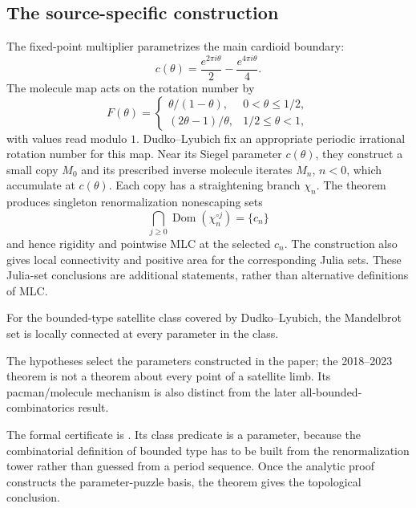\subsection{The source-specific construction}

The fixed-point multiplier parametrizes the main cardioid boundary:
\[
 c(\theta)=\frac{e^{2\pi i\theta}}2
              -\frac{e^{4\pi i\theta}}4.
\]
The molecule map acts on the rotation number by
\[
 F(\theta)=
 \begin{cases}
 \theta/(1-\theta),&0<\theta\le1/2,\\
 (2\theta-1)/\theta,&1/2\le\theta<1,
 \end{cases}
\]
with values read modulo $1$.  Dudko--Lyubich fix an appropriate
periodic irrational rotation number for this map.  Near its Siegel
parameter $c(\theta)$, they construct a small copy $M_0$ and its
prescribed inverse molecule iterates $M_n$, $n<0$, which accumulate
at $c(\theta)$.  Each copy has a straightening branch $\chi_n$.
The theorem produces singleton renormalization nonescaping sets
\[
 \bigcap_{j\ge0}\operatorname{Dom}(\chi_n^{\circ j})=\{c_n\}
\]
and hence rigidity and pointwise MLC at the selected $c_n$.
The construction also gives local connectivity and positive area for
the corresponding Julia sets.  These Julia-set conclusions are
additional statements, rather than alternative definitions of MLC.

\begin{theorem}
\label{thm:dudko-lyubich-satellite}
For the bounded-type satellite class covered by Dudko--Lyubich, the
Mandelbrot set is locally connected at every parameter in the class.
\end{theorem}

The hypotheses select the parameters constructed in the paper; the
2018--2023 theorem is not a theorem about every point of a satellite
limb.  Its pacman/molecule mechanism is also distinct from the later
all-bounded-combinatorics result.

The formal certificate is
.  Its class predicate is a parameter,
because the combinatorial definition of bounded type has to be built from
the renormalization tower rather than guessed from a period sequence.
Once the analytic proof constructs the parameter-puzzle basis, the theorem
 gives the
topological conclusion.


